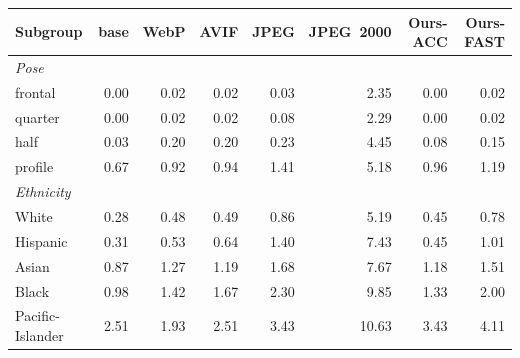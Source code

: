 \begin{tabular}{lrrrrrrr}
    \toprule
    Subgroup & base & WebP & AVIF & JPEG & JPEG~2000 & Ours-ACC & Ours-FAST \\
    \midrule
    \multicolumn{8}{l}{\emph{Pose}}\\
    frontal  & 0.00 & 0.02 & 0.02 & 0.03 & 2.35 & 0.00 & 0.02 \\
    quarter  & 0.00 & 0.02 & 0.02 & 0.08 & 2.29 & 0.00 & 0.02 \\
    half     & 0.03 & 0.20 & 0.20 & 0.23 & 4.45 & 0.08 & 0.15 \\
    profile  & 0.67 & 0.92 & 0.94 & 1.41 & 5.18 & 0.96 & 1.19 \\
    \midrule
    \multicolumn{8}{l}{\emph{Ethnicity}}\\
    White            & 0.28 & 0.48 & 0.49 & 0.86 & 5.19 & 0.45 & 0.78 \\
    Hispanic         & 0.31 & 0.53 & 0.64 & 1.40 & 7.43 & 0.45 & 1.01 \\
    Asian            & 0.87 & 1.27 & 1.19 & 1.68 & 7.67 & 1.18 & 1.51 \\
    Black            & 0.98 & 1.42 & 1.67 & 2.30 & 9.85 & 1.33 & 2.00 \\
    Pacific-Islander & 2.51 & 1.93 & 2.51 & 3.43 & 10.63 & 3.43 & 4.11 \\
    \bottomrule
  \end{tabular}
